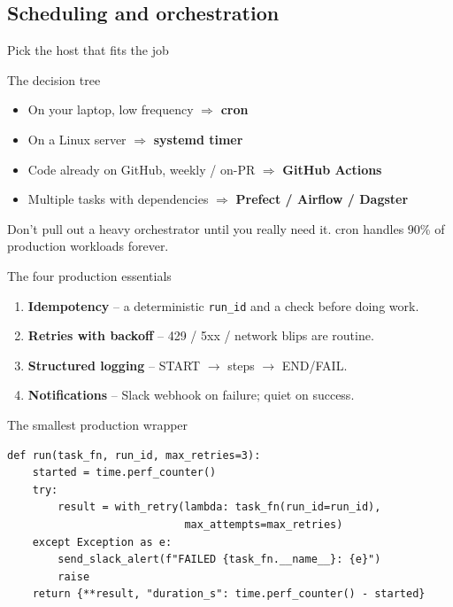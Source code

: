 \documentclass[aspectratio=169,11pt]{beamer}
\begin{document}
\subsection{Scheduling and orchestration}

\begin{frame}{Pick the host that fits the job}
  \begin{block}{The decision tree}
    \begin{itemize}
      \item On your laptop, low frequency $\Rightarrow$ \textbf{cron}
      \item On a Linux server $\Rightarrow$ \textbf{systemd timer}
      \item Code already on GitHub, weekly / on-PR $\Rightarrow$ \textbf{GitHub Actions}
      \item Multiple tasks with dependencies $\Rightarrow$ \textbf{Prefect / Airflow / Dagster}
    \end{itemize}
  \end{block}
  \vspace{4pt}
  Don't pull out a heavy orchestrator until you really need it. cron handles
  90\% of production workloads forever.
\end{frame}

\begin{frame}[fragile]{The four production essentials}
  \begin{enumerate}
    \item \textbf{Idempotency} -- a deterministic \texttt{run\_id} and a check before doing work.
    \item \textbf{Retries with backoff} -- 429 / 5xx / network blips are routine.
    \item \textbf{Structured logging} -- START $\to$ steps $\to$ END/FAIL.
    \item \textbf{Notifications} -- Slack webhook on failure; quiet on success.
  \end{enumerate}
  \vspace{4pt}
  \begin{exampleblock}{The smallest production wrapper}
\begin{lstlisting}
def run(task_fn, run_id, max_retries=3):
    started = time.perf_counter()
    try:
        result = with_retry(lambda: task_fn(run_id=run_id),
                            max_attempts=max_retries)
    except Exception as e:
        send_slack_alert(f"FAILED {task_fn.__name__}: {e}")
        raise
    return {**result, "duration_s": time.perf_counter() - started}
\end{lstlisting}
  \end{exampleblock}
\end{frame}
\end{document}
